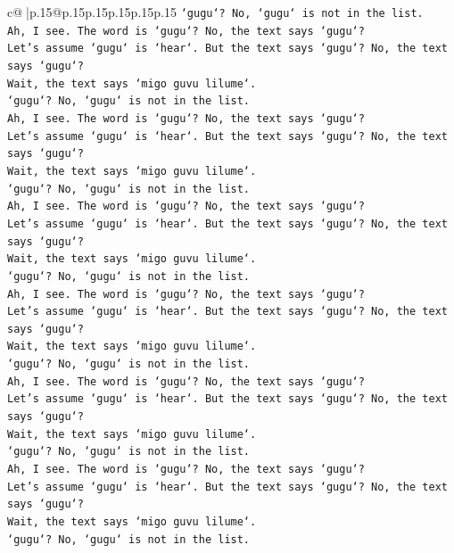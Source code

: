 \documentclass{article}
\begin{document}
{\begin{supertabular}{c@{$\;$}|p{.15\linewidth}@{}p{.15\linewidth}p{.15\linewidth}p{.15\linewidth}p{.15\linewidth}p{.15\linewidth}}
{{{\texttt{`gugu`? No, `gugu` is not in the list.} \\
\texttt{Ah, I see. The word is `gugu`? No, the text says `gugu`?} \\
\texttt{Let's assume `gugu` is `hear`. But the text says `gugu`? No, the text says `gugu`?} \\
\texttt{Wait, the text says `migo guvu lilume`.} \\
\texttt{`gugu`? No, `gugu` is not in the list.} \\
\texttt{Ah, I see. The word is `gugu`? No, the text says `gugu`?} \\
\texttt{Let's assume `gugu` is `hear`. But the text says `gugu`? No, the text says `gugu`?} \\
\texttt{Wait, the text says `migo guvu lilume`.} \\
\texttt{`gugu`? No, `gugu` is not in the list.} \\
\texttt{Ah, I see. The word is `gugu`? No, the text says `gugu`?} \\
\texttt{Let's assume `gugu` is `hear`. But the text says `gugu`? No, the text says `gugu`?} \\
\texttt{Wait, the text says `migo guvu lilume`.} \\
\texttt{`gugu`? No, `gugu` is not in the list.} \\
\texttt{Ah, I see. The word is `gugu`? No, the text says `gugu`?} \\
\texttt{Let's assume `gugu` is `hear`. But the text says `gugu`? No, the text says `gugu`?} \\
\texttt{Wait, the text says `migo guvu lilume`.} \\
\texttt{`gugu`? No, `gugu` is not in the list.} \\
\texttt{Ah, I see. The word is `gugu`? No, the text says `gugu`?} \\
\texttt{Let's assume `gugu` is `hear`. But the text says `gugu`? No, the text says `gugu`?} \\
\texttt{Wait, the text says `migo guvu lilume`.} \\
\texttt{`gugu`? No, `gugu` is not in the list.} \\
\texttt{Ah, I see. The word is `gugu`? No, the text says `gugu`?} \\
\texttt{Let's assume `gugu` is `hear`. But the text says `gugu`? No, the text says `gugu`?} \\
\texttt{Wait, the text says `migo guvu lilume`.} \\
\texttt{`gugu`? No, `gugu` is not in the list.} \\
}}}
\end{supertabular}}
\end{document}
